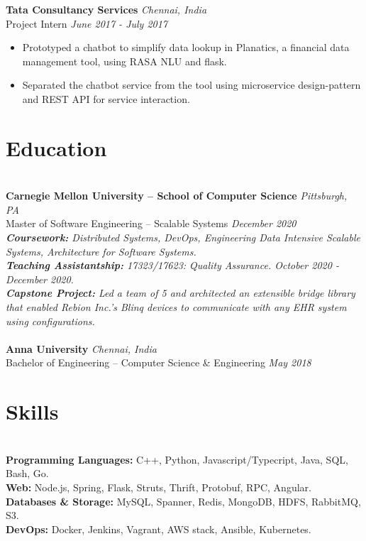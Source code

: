 \documentclass{resume}
\begin{document}
\textbf{Tata Consultancy Services} \hfill \textit{Chennai, India} \\
{\small Project Intern} \hfill \textit{\small June 2017 - July 2017}
\begin{itemize}
  \item Prototyped a chatbot to simplify data lookup in Planatics, a financial data management tool, using RASA NLU and flask.
  \item Separated the chatbot service from the tool using microservice design-pattern and REST API for service interaction.
\end{itemize}
	
\section*{Education}
\titlerule[0.2pt]
\noindent
\\
\textbf{Carnegie Mellon University -- School of Computer Science} \hfill \textit{Pittsburgh, PA} \\
{\small Master of Software Engineering -- Scalable Systems} \hfill \textit{\small December 2020}\\
\textit{\textbf{Coursework:} Distributed Systems, DevOps, Engineering Data Intensive Scalable Systems, Architecture for Software Systems.}\\
\textit{\textbf{Teaching Assistantship:} 17323/17623: Quality Assurance. October 2020 - December 2020.}\\
\textit{\textbf{Capstone Project:} Led a team of 5 and architected an extensible bridge library that enabled Rebion Inc.'s Blinq devices to communicate with any EHR system using configurations.}\\
\\
\textbf{Anna University} \hfill \textit{Chennai, India} \\
{\small Bachelor of Engineering -- Computer Science \& Engineering} \hfill \textit{\small May 2018}

\section*{Skills}
\titlerule[0.2pt]
\noindent
\\
\textbf{Programming Languages:} C++, Python, Javascript/Typecript, Java, SQL, Bash, Go. \\
\textbf{Web:} Node.js, Spring, Flask, Struts, Thrift, Protobuf, RPC, Angular. \\
\textbf{Databases \& Storage:} MySQL, Spanner, Redis, MongoDB, HDFS, RabbitMQ, S3. \\
\textbf{DevOps:} Docker, Jenkins, Vagrant, AWS stack, Ansible, Kubernetes. \\

\end{document}
